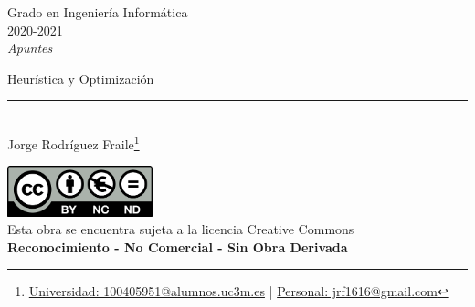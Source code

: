\documentclass[12pt, twoside, openright]{report} %
\begin{document}

\begin{titlepage}
	\begin{sffamily}
		\color{azulUC3M}
		\begin{center}
			\begin{figure}[H] %
			\end{figure}
			\vspace{2.5cm}
			\begin{Large}
				Grado en Ingeniería Informática\\
				2020-2021\\
				\vspace{2cm}
				\textsl{Apuntes}\\
				\bigskip
			\end{Large}
			{\Huge Heurística y Optimización}\\
			\vspace*{0.5cm}
			\rule{10.5cm}{0.1mm}\\
			\vspace*{0.9cm}
			{\LARGE Jorge Rodríguez Fraile\footnote{\href{mailto:100405951@alumnos.uc3m.es}{Universidad: 100405951@alumnos.uc3m.es}  |  \href{mailto:jrf1616@gmail.com}{Personal: jrf1616@gmail.com}}}\\
			\vspace*{1cm}
		\end{center}
		\vfill
		\color{black}
		\includegraphics[width=4.2cm]{img/creativecommons.png}\\
		Esta obra se encuentra sujeta a la licencia Creative Commons\\ \textbf{Reconocimiento - No Comercial - Sin Obra Derivada}
	\end{sffamily}
\end{titlepage}


\tableofcontents
\thispagestyle{fancy}
\end{document}
